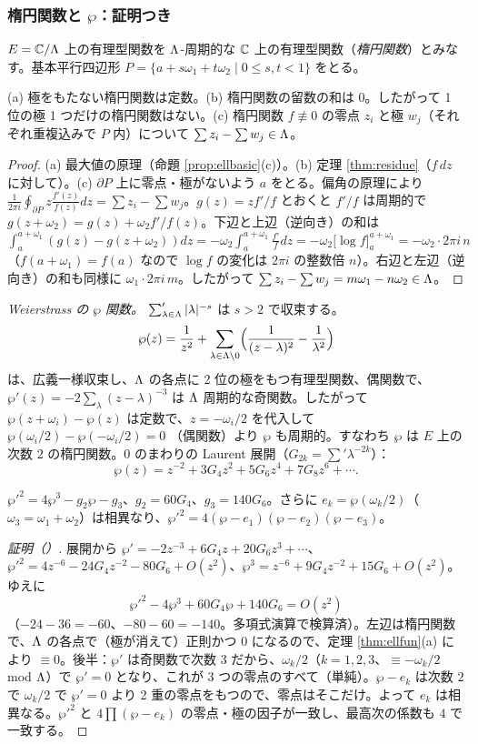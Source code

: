 \subsubsection*{楕円関数と $\wp$：証明つき}
$E=\mathbb C/\Lambda$ 上の有理型関数を $\Lambda$-周期的な $\mathbb C$ 上の有理型関数（\emph{楕円関数}）とみなす。基本平行四辺形 $P=\{a+s\omega_1+t\omega_2\mid0\le s,t<1\}$ をとる。
\begin{thm}\label{thm:ellfun}
(a) 極をもたない楕円関数は定数。(b) 楕円関数の留数の和は $0$。したがって 1 位の極 1 つだけの楕円関数はない。(c) 楕円関数 $f\not\equiv0$ の零点 $z_i$ と極 $w_j$（それぞれ重複込みで $P$ 内）について $\sum z_i-\sum w_j\in\Lambda$。
\end{thm}
\begin{proof}
(a) 最大値の原理（命題 \ref{prop:ellbasic}(c)）。(b) 定理 \ref{thm:residue}（$f\,dz$ に対して）。(c) $\partial P$ 上に零点・極がないよう $a$ をとる。偏角の原理により $\frac1{2\pi i}\oint_{\partial P}z\frac{f'(z)}{f(z)}dz=\sum z_i-\sum w_j$。$g(z)=zf'/f$ とおくと $f'/f$ は周期的で $g(z+\omega_2)=g(z)+\omega_2f'/f(z)$。下辺と上辺（逆向き）の和は $\int_a^{a+\omega_1}(g(z)-g(z+\omega_2))dz=-\omega_2\int_a^{a+\omega_1}\frac{f'}{f}dz=-\omega_2\bigl[\log f\bigr]_a^{a+\omega_1}=-\omega_2\cdot2\pi i\,n$（$f(a+\omega_1)=f(a)$ なので $\log f$ の変化は $2\pi i$ の整数倍 $n$）。右辺と左辺（逆向き）の和も同様に $\omega_1\cdot2\pi i\,m$。したがって $\sum z_i-\sum w_j=m\omega_1-n\omega_2\in\Lambda$。 
\end{proof}
\emph{Weierstrass の $\wp$ 関数。} $\sum'_{\lambda\in\Lambda}|\lambda|^{-s}$ は $s>2$ で収束する。
\[
\wp(z)=\frac1{z^2}+\sum_{\lambda\in\Lambda\setminus0}\Bigl(\frac1{(z-\lambda)^2}-\frac1{\lambda^2}\Bigr)
\]
は、広義一様収束し、$\Lambda$ の各点に 2 位の極をもつ有理型関数、偶関数で、$\wp'(z)=-2\sum_\lambda(z-\lambda)^{-3}$ は $\Lambda$ 周期的な奇関数。したがって $\wp(z+\omega_i)-\wp(z)$ は定数で、$z=-\omega_i/2$ を代入して $\wp(\omega_i/2)-\wp(-\omega_i/2)=0$ （偶関数）より $\wp$ も周期的。すなわち $\wp$ は $E$ 上の次数 $2$ の楕円関数。$0$ のまわりの Laurent 展開（$G_{2k}=\sum'\lambda^{-2k}$）：
\[
\wp(z)=z^{-2}+3G_4z^2+5G_6z^4+7G_8z^6+\cdots .
\]
\begin{thm}[$\wp$ の微分方程式]\label{thm:wpode}
$\wp'^2=4\wp^3-g_2\wp-g_3$、$g_2=60G_4$、$g_3=140G_6$。さらに $e_k=\wp(\omega_k/2)$（$\omega_3=\omega_1+\omega_2$）は相異なり、$\wp'^2=4(\wp-e_1)(\wp-e_2)(\wp-e_3)$。
\end{thm}
\begin{proof}[証明（\tP）]
展開から $\wp'=-2z^{-3}+6G_4z+20G_6z^3+\cdots$、$\wp'^2=4z^{-6}-24G_4z^{-2}-80G_6+O(z^2)$、$\wp^3=z^{-6}+9G_4z^{-2}+15G_6+O(z^2)$。ゆえに
\[
\wp'^2-4\wp^3+60G_4\wp+140G_6=O(z^2)
\]
（$-24-36=-60$、$-80-60=-140$。多項式演算で検算済）。左辺は楕円関数で、$\Lambda$ の各点で（極が消えて）正則かつ $0$ になるので、定理 \ref{thm:ellfun}(a) により $\equiv0$。後半：$\wp'$ は奇関数で次数 $3$ だから、$\omega_k/2$（$k=1,2,3$、$\equiv-\omega_k/2$ mod $\Lambda$）で $\wp'=0$ となり、これが $3$ つの零点のすべて（単純）。$\wp-e_k$ は次数 $2$ で $\omega_k/2$ で $\wp'=0$ より 2 重の零点をもつので、零点はそこだけ。よって $e_k$ は相異なる。$\wp'^2$ と $4\prod(\wp-e_k)$ の零点・極の因子が一致し、最高次の係数も $4$ で一致する。 
\end{proof}
